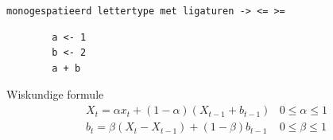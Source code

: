 \documentclass[aspectratio=169]{beamer}
\begin{document}
\begin{frame}[fragile]
    \texttt{monogespatieerd lettertype met ligaturen -> <= >=}

    \begin{verbatim}
        a <- 1
        b <- 2
        a + b
    \end{verbatim}
\end{frame}

\begin{frame}{Wiskundige formule}
  \begin{eqnarray}
    X_{t} = \alpha x_{t} + (1-\alpha)(X_{t-1} + b_{t-1}) & 0 \leq \alpha \leq 1 \\
    b_{t} = \beta(X_{t}-X_{t-1}) + (1-\beta)b_{t-1} & 0 \leq \beta \leq 1 
    \label{eq:doubleSmoothing}
  \end{eqnarray}
\end{frame}
\end{document}

